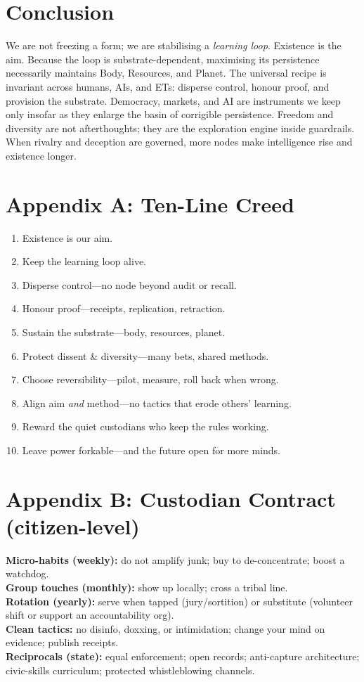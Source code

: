 \documentclass[11pt,a4paper]{article}
\begin{document}
\section{Conclusion}
\label{sec:conclusion}
We are not freezing a form; we are stabilising a \emph{learning loop}. Existence is the aim. Because the loop is substrate-dependent, maximising its persistence necessarily maintains Body, Resources, and Planet. The universal recipe is invariant across humans, AIs, and ETs: disperse control, honour proof, and provision the substrate. Democracy, markets, and AI are instruments we keep only insofar as they enlarge the basin of corrigible persistence. Freedom and diversity are not afterthoughts; they are the exploration engine inside guardrails. When rivalry and deception are governed, more nodes make intelligence rise and existence longer.

\appendix
\section*{Appendix A: Ten-Line Creed}
\begin{enumerate}[leftmargin=1.2em]
\item Existence is our aim.
\item Keep the learning loop alive.
\item Disperse control---no node beyond audit or recall.
\item Honour proof---receipts, replication, retraction.
\item Sustain the substrate---body, resources, planet.
\item Protect dissent \& diversity---many bets, shared methods.
\item Choose reversibility---pilot, measure, roll back when wrong.
\item Align aim \emph{and} method---no tactics that erode others’ learning.
\item Reward the quiet custodians who keep the rules working.
\item Leave power forkable---and the future open for more minds.
\end{enumerate}

\section*{Appendix B: Custodian Contract (citizen-level)}
\textbf{Micro-habits (weekly):} do not amplify junk; buy to de-concentrate; boost a watchdog.\\
\textbf{Group touches (monthly):} show up locally; cross a tribal line.\\
\textbf{Rotation (yearly):} serve when tapped (jury/sortition) or substitute (volunteer shift or support an accountability org).\\
\textbf{Clean tactics:} no disinfo, doxxing, or intimidation; change your mind on evidence; publish receipts.\\
\textbf{Reciprocals (state):} equal enforcement; open records; anti-capture architecture; civic-skills curriculum; protected whistleblowing channels.
\end{document}
